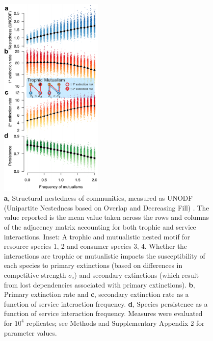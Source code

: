\documentclass[twocolumn,preprintnumbers,amsmath,amssymb,superscriptaddress,linenumbers]{revtex4-1}
\begin{document}
\begin{figure}[h!]
\centering
\includegraphics[width=0.45\textwidth]{fig_nested3.pdf}
\vspace{0mm}
\caption{
\textbf{a}, Structural nestedness of communities, measured as UNODF (Unipartite Nestedness based on Overlap and Decreasing Fill) \cite{Cantor2017}.
The value reported is the mean value taken across the rows and columns of the adjacency matrix accounting for both trophic and service interactions.
Inset: A trophic and mutualistic nested motif for resource species 1, 2 and consumer species 3, 4.
Whether the interactions are trophic or mutualistic impacts the susceptibility of each species to primary extinctions (based on differences in competitive strength $\sigma_i$) and secondary extinctions (which result from lost dependencies associated with primary extinctions).
\textbf{b}, Primary extinction rate and \textbf{c}, secondary extinction rate as a function of service interaction frequency.
\textbf{d}, Species persistence as a function of service interaction frequency.
Measures were evaluated for $10^4$ replicates; see Methods and Supplementary Appendix 2 for parameter values.
\vspace{0mm}
}
\label{fig:nest}
\end{figure}
\end{document}

